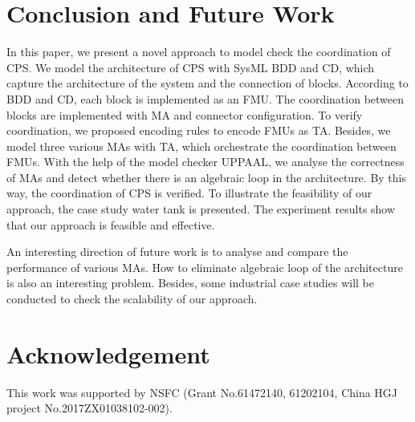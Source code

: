 \section{Conclusion and Future Work}
\label{sec:conclusion&ack}
In this paper, we present a novel approach to model check the coordination of CPS.  We model the architecture of CPS with SysML BDD and CD, which capture the architecture of the system and the connection of blocks. According to BDD and CD, each block is implemented as an FMU. The coordination between blocks are implemented with MA and connector configuration. To verify coordination, we proposed encoding rules to encode FMUs as TA. Besides, we model three various MAs with TA, which orchestrate the coordination between FMUs. With the help of the model checker UPPAAL, we  analyse the correctness of MAs and detect whether there is an algebraic loop in the architecture. By this way, the coordination of CPS is verified. To illustrate the feasibility of our approach, the case study water tank is presented. The experiment results show that our approach is feasible and effective. 

An interesting direction of future work is to analyse and compare the performance of various MAs. How to eliminate algebraic loop of the architecture is also an interesting problem. Besides, some industrial case studies will be conducted to check the scalability of our approach.
\section*{Acknowledgement}
This work was supported by NSFC (Grant No.61472140, 61202104, China HGJ project No.2017ZX01038102-002). 




